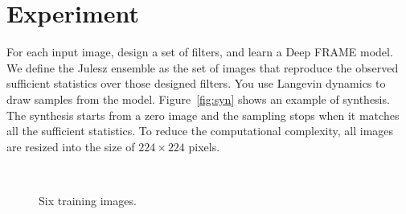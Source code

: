 \documentclass[11pt]{article}
\begin{document}
\section{Experiment}
For each input image, design a set of filters, and learn a Deep FRAME model. We define the Julesz ensemble as the set of images that reproduce the observed sufficient statistics over those designed filters. You use Langevin dynamics to draw samples from the model. Figure~\ref{fig:syn} shows an example of synthesis. The synthesis starts from a zero image and the sampling stops when it matches all the sufficient statistics. To reduce the computational complexity, all images are resized into the size of $224\times224$ pixels.

\begin{figure}[h]
	\centering
	\setlength{\fboxrule}{1pt}
	\setlength{\fboxsep}{0cm}	
	\\[3px]
	\caption{Six training images.}
\end{figure}
\end{document}
